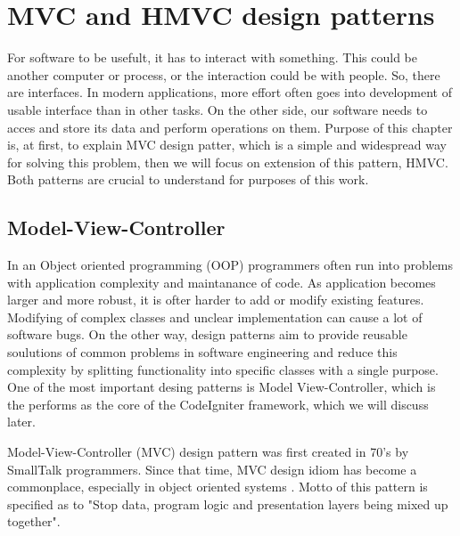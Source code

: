 \chapter{MVC and HMVC design patterns}

\label{kap:courses} %


For software to be usefult, it has to interact with something. This could be another computer or process, or the interaction could be with people. So, there are interfaces. In modern applications, more effort often goes into development of usable interface than in other tasks. On the other side, our software needs to acces and store its data and perform operations on them. Purpose of this chapter is, at first, to explain MVC design patter, which is a simple and widespread way for solving this problem, then we will focus on extension of this pattern, HMVC. Both patterns are crucial to understand for purposes of this work.


\section{Model-View-Controller}


In an Object oriented programming (OOP) programmers often run into problems with application complexity and maintanance of code. As application becomes larger and more robust, it is ofter harder to add or modify existing features. Modifying of complex classes and unclear implementation can cause a lot of software bugs. On the other way, design patterns aim to provide reusable soulutions of common problems in software engineering and reduce this complexity by splitting functionality into specific classes with a single purpose. One of the most important desing patterns is Model View-Controller, which is the performs as the core of the CodeIgniter framework, which we will discuss later.


Model-View-Controller (MVC) design pattern was first created in 70’s by SmallTalk programmers. Since that time, MVC design idiom has become a commonplace, especially in object oriented systems \cite{deacon2009model}. Motto of this pattern is specified as to "Stop data, program logic and presentation layers being mixed up together".

